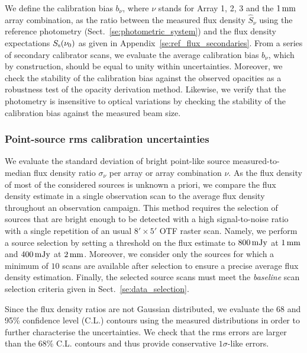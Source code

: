 We define the calibration bias
$b_{\nu}$, where $\nu$ stands for Array 1, 2, 3 and the
$1\,\rm{mm}$ array combination, as
the ratio between the measured flux density $\hat{S}_{\nu}$ using the
reference photometry
(Sect.~\ref{se:photometric_system}) and the flux density
expectations $S_{\rm{s}}(\nu_0)$ as given in
Appendix~\ref{se:ref_flux_secondaries}. From a series of
secondary calibrator scans, we evaluate the average calibration bias
$b_{\nu}$, which by construction, should be equal to
unity within uncertainties.
Moreover, we check the stability of the calibration bias against
the observed opacities as a robustness test of the
opacity derivation method. Likewise, we verify that the photometry is
insensitive to optical variations by checking the stability of the
calibration bias against the measured beam size.

\subsubsection{{\rev Point-source} rms calibration uncertainties}
\label{se:def_calibration_rms_error}
We evaluate the standard deviation of bright {\rev point-like} source
measured-to-median flux density ratio $\sigma_{\nu}$ per array or array combination $\nu$.
As the flux density of most of the considered sources is unknown a priori, we
compare the flux density estimate in a single observation scan to the
average flux density throughout an observation campaign. This method
requires the selection of sources that are bright enough to be
detected with a high signal-to-noise ratio with a single repetition of an usual
$8'\times 5'$ OTF raster scan. Namely, we perform a source
selection by setting a threshold on the flux estimate to $800\,\rm{mJy}$ at
$1\,\rm{mm}$ and $400\,\rm{mJy}$ at $2\,\rm{mm}$. Moreover, we consider
only the sources for which a minimum of $10$ scans are available after
selection to ensure a precise average flux density
estimation. Finally, the selected source scans must meet the \emph{baseline}
scan selection criteria given in Sect.~\ref{se:data_selection}.

{\lp Since the flux density ratios are not Gaussian distributed, we
evaluate the 68 and 95\% confidence level (C.L.) contours using the
measured distributions in order to further characterise the
uncertainties. We check that the rms
errors are larger than the 68\% C.L. contours and thus provide
conservative $1\sigma$-like errors.}    

